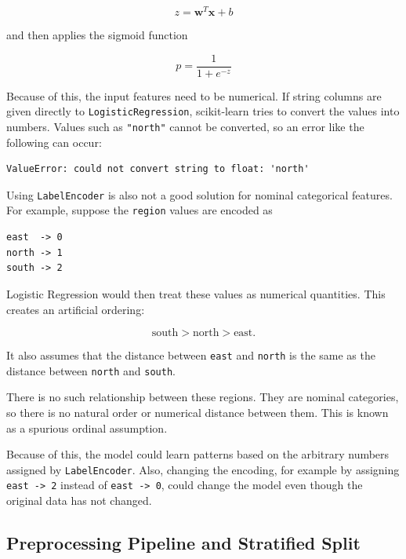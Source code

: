 \documentclass[12pt,a4paper]{article}
\begin{document}
\begin{equation}
z = \mathbf{w}^T\mathbf{x} + b
\label{eq:linscore}
\end{equation}

and then applies the sigmoid function

\begin{equation}
p = \frac{1}{1+e^{-z}}
\label{eq:sigmoid2}
\end{equation}

Because of this, the input features need to be numerical. If string columns are given directly to
\texttt{LogisticRegression}, scikit-learn tries to convert the values into numbers. Values such as
\texttt{"north"} cannot be converted, so an error like the following can occur:

\begin{lstlisting}[style=plainout]
ValueError: could not convert string to float: 'north'
\end{lstlisting}

Using \texttt{LabelEncoder} is also not a good solution for nominal categorical features. For
example, suppose the \texttt{region} values are encoded as

\begin{lstlisting}[style=plainout]
east  -> 0
north -> 1
south -> 2
\end{lstlisting}

Logistic Regression would then treat these values as numerical quantities. This creates an
artificial ordering:

\begin{equation*}
\text{south} > \text{north} > \text{east}.
\end{equation*}

It also assumes that the distance between \texttt{east} and \texttt{north} is the same as the
distance between \texttt{north} and \texttt{south}.

There is no such relationship between these regions. They are nominal categories, so there is no
natural order or numerical distance between them. This is known as a spurious ordinal assumption.

Because of this, the model could learn patterns based on the arbitrary numbers assigned by
\texttt{LabelEncoder}. Also, changing the encoding, for example by assigning
\texttt{east -> 2} instead of \texttt{east -> 0}, could change the model even though the original
data has not changed.

\subsection{Preprocessing Pipeline and Stratified Split}
\end{document}
